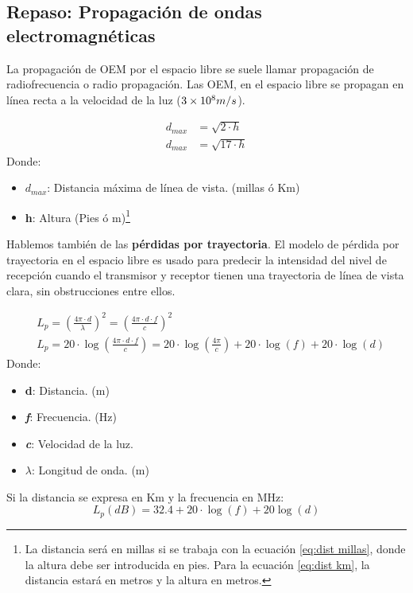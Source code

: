 \documentclass[
	12pt, %
	fleqn, %
	a4paper, %
	oneside, %
]{LegrandOrangeBook}
\begin{document}
\subsection{Repaso: Propagación de ondas electromagnéticas}
La propagación de OEM por el espacio libre se suele llamar propagación de radiofrecuencia o radio propagación. Las OEM, en el espacio libre se propagan en línea recta a la velocidad de la luz ($3\times 10^{8}m/s$). 
\begin{definition}
\begin{subequations}
\begin{align}
d_{max}&=\sqrt{2\cdot h}
\label{eq:dist millas} \\
d_{max}&=\sqrt{17\cdot h}\label{eq:dist km}
\end{align}
\end{subequations}
Donde:
\begin{itemize}
\item $d_{max}$: Distancia máxima de línea de vista. (millas ó Km)
\item \textbf{h}: Altura (Pies ó m)\footnote{La distancia será en millas si se trabaja con la ecuación \ref{eq:dist millas}, donde la altura debe ser introducida en pies. Para la ecuación \ref{eq:dist km}, la distancia estará en metros y la altura en metros.}
\end{itemize}
\end{definition}
Hablemos también de las \textbf{pérdidas por trayectoria}. El modelo de pérdida por trayectoria en el espacio libre es usado para predecir la intensidad del nivel de recepción cuando el transmisor y receptor tienen una trayectoria de línea de vista clara, sin obstrucciones entre ellos.
\begin{definition}
\begin{subequations}
\begin{align}
&L_p=\left(\frac{4\pi\cdot d}{\lambda}\right)^2=\left(\frac{4\pi\cdot d\cdot f}{c}\right)^2
\label{eq:perdidas trayec adimensional} \\
&L_p=20\cdot\log\left(\frac{4\pi\cdot d\cdot f}{c}\right)=20\cdot\log\left(\frac{4\pi}{c}\right)+20\cdot\log(f)+20\cdot\log(d)\label{eq:perdidas trayec db}
\end{align}
\end{subequations}
Donde:
\begin{itemize}
\item \textbf{d}: Distancia. (m)
\item \textbf{\textit{f}}: Frecuencia. (Hz)
\item \textbf{\textit{c}}: Velocidad de la luz.
\item $\lambda$: Longitud de onda. (m)
\end{itemize}
Si la distancia se expresa en Km y la frecuencia en MHz:
\begin{equation}
L_p(dB)=32.4+20\cdot\log(f)+20\log(d)
\end{equation}
\end{definition}
\end{document}
